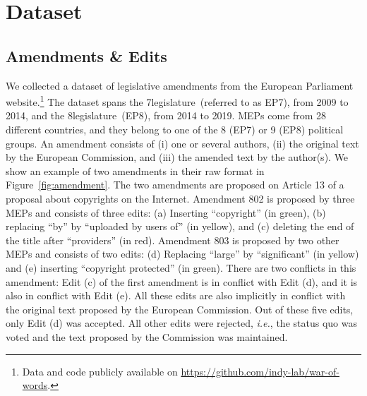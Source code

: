 \section{Dataset}
\label{sec:data}

\subsection{Amendments \& Edits}

We collected a dataset of  legislative amendments from the European Parliament website.\footnote{Data and code publicly available on \href{https://github.com/indy-lab/war-of-words}{https://github.com/indy-lab/war-of-words}.}
The dataset spans the 7\th legislature~(referred to as EP7), from 2009 to 2014, and the 8\th legislature~(EP8), from 2014 to 2019.
MEPs come from 28 different countries, and they belong to one of the 8 (EP7) or 9 (EP8) political groups.
An amendment consists of (i) one or several authors, (ii) the original text by the European Commission, and (iii) the amended text by the author(s).
We show an example of two amendments in their raw format in Figure~\ref{fig:amendment}.
The two amendments are proposed on Article 13 of a proposal about copyrights on the Internet.
Amendment 802 is proposed by three MEPs and consists of three edits:
(a) Inserting ``copyright'' (in green), (b) replacing ``by'' by ``uploaded by users of'' (in yellow), and (c) deleting the end of the title after ``providers'' (in red).
Amendment 803 is proposed by two other MEPs and consists of two edits:
(d) Replacing ``large'' by ``significant'' (in yellow) and (e) inserting ``copyright protected'' (in green).
There are two conflicts in this amendment:
Edit (c) of the first amendment is in conflict with Edit (d), and it is also in conflict with Edit (e).
All these edits are also implicitly in conflict with the original text proposed by the European Commission.
Out of these five edits, only Edit (d) was accepted.
All other edits were rejected, \textit{i.e.}, the status quo was voted and the text proposed by the Commission was maintained.

